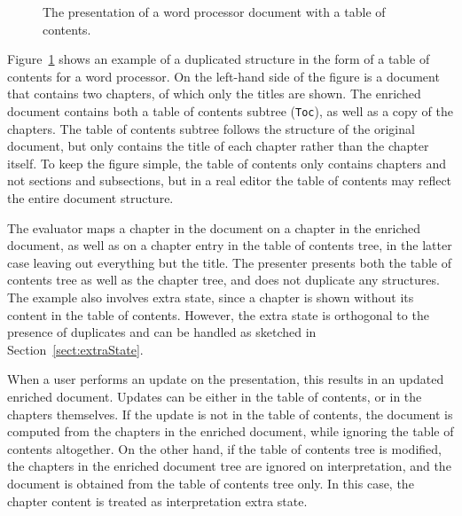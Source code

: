 \begin{figure}
\begin{center}
\begin{center}
%
%
\end{center}
\caption{The presentation of a word processor document with a table of contents.}\label{duplicatesExample} 
\end{center}
\end{figure}


Figure~\ref{duplicatesExample} shows an example of a duplicated structure in the form of a table of contents for a word processor. On the left-hand side of the figure is a document that contains two chapters, of which only the titles are shown. The enriched document contains both a table of contents subtree (\verb|Toc|), as well as a copy of the chapters. The table of contents subtree follows the structure of the original document, but only contains the title of each chapter rather than the chapter itself. To keep the figure simple, the table of contents only contains chapters and not sections and subsections, but in a real editor the table of contents may reflect the entire document structure. 

The evaluator maps a chapter in the document on a chapter in the enriched document, as well as on a chapter entry in the table of contents tree, in the latter case leaving out everything but the title. The presenter presents both the table of contents tree as well as the chapter tree, and does not duplicate any structures. The example also involves extra state, since a chapter is shown without its content in the table of contents. However, the extra state is orthogonal to the presence of duplicates and can be handled as sketched in Section~\ref{sect:extraState}.

When a user performs an update on the presentation, this results in an updated enriched document. Updates can be either in the table of contents, or in the chapters themselves. If the update is not in the table of contents, the document is computed from the chapters in the enriched document, while ignoring the table of contents altogether. On the other hand, if the table of contents tree is modified, the chapters in the enriched document tree are ignored on interpretation, and the document is obtained from the table of contents tree only. In this case, the chapter content is treated as interpretation extra state. 

